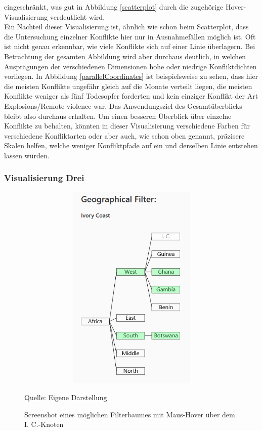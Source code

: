 \documentclass[usegeometry=true]{scrartcl}
\begin{document}
eingeschränkt, was gut in Abbildung \ref{scatterplot} durch die zugehörige Hover-Visualisierung verdeutlicht wird.\\ Ein Nachteil dieser Visualisierung ist, ähnlich wie schon beim Scatterplot, dass die Untersuchung einzelner Konflikte hier nur in Ausnahmefällen möglich ist. Oft ist nicht genau erkennbar, wie viele Konflikte sich auf einer Linie überlagern. Bei Betrachtung der gesamten Abbildung wird aber durchaus deutlich, in welchen Ausprägungen der verschiedenen Dimensionen hohe oder niedrige Konfliktdichten vorliegen. In Abbildung \ref{parallelCoordinates} ist beispielsweise zu sehen, dass hier die meisten Konflikte ungefähr gleich auf die Monate verteilt liegen, die meisten Konflikte weniger als fünf Todesopfer forderten und kein einziger Konflikt der Art \glqq Explosions/Remote violence\grqq{} war. Das Anwendungsziel des Gesamtüberblicks bleibt also durchaus erhalten. Um einen besseren Überblick über einzelne Konflikte zu behalten, könnten in dieser Visualisierung verschiedene Farben für verschiedene Konfliktarten oder aber auch, wie schon oben genannt, präzisere Skalen helfen, welche weniger Konfliktpfade auf ein und derselben Linie entstehen lassen würden.\\

\subsubsection{Visualisierung Drei}

\begin{figure}[]
\begin{center}
\includegraphics[width=12cm,height=10cm,keepaspectratio]{FilterTree.PNG}%
\caption{Screenshot eines möglichen Filterbaumes mit Maus-Hover über dem \glqq I. C.\grqq-Knoten}
Quelle: Eigene Darstellung
\label{filtertree}
\end{center}
\end{figure}
\end{document}
